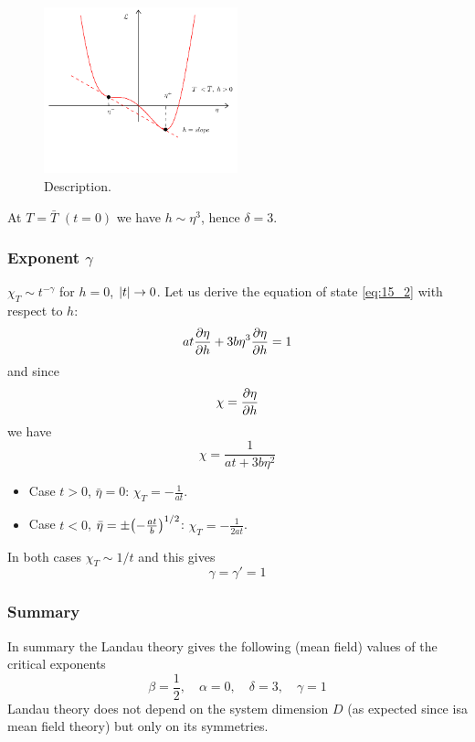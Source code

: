 \documentclass[../main/main.tex]{subfiles}
\begin{document}
\begin{figure}[h!]
\centering
\includegraphics[width=0.5\textwidth]{../lessons/15_image/15.pdf}
\caption{\label{fig:} Description.}
\end{figure}
At \( T= \bar{T}  \) \( (t=0) \) we have \( h \sim \eta ^3 \), hence \( \delta =3 \).

\subsubsection{Exponent \( \gamma   \)}
\( \chi _T \sim t^{- \gamma  } \) for \( h=0 \), \( \abs{t} \rightarrow 0  \). Let us derive the equation of state \eqref{eq:15_2} with respect to \( h \):
\begin{equation}
  a t \pdv{\eta }{h} + 3 b \eta ^3 \pdv{\eta }{h} = 1
\end{equation}
and since
\begin{equation}
  \chi = \pdv{\eta }{h}
\end{equation}
we have
\begin{equation}
  \chi = \frac{1}{at+3 b \eta ^2}
\end{equation}
\begin{itemize}
\item Case \( t>0 \), \( \bar{\eta } = 0  \): \( \chi _T = - \frac{1}{at} \).
\item Case \( t<0 \), \( \bar{\eta } = \pm \qty(- \frac{at}{b})^{1/2}   \): \( \chi _T = - \frac{1}{2at} \).
\end{itemize}
In both cases \( \chi _T \sim  1/t \) and this gives
\begin{equation}
  \gamma = \gamma' = 1
\end{equation}

\subsubsection{Summary}
In summary the Landau theory gives the following (mean field) values of the critical exponents
\begin{equation}
  \beta = \frac{1}{2}, \quad \alpha =0, \quad \delta =3, \quad \gamma =1
\end{equation}
Landau theory does not depend on the system dimension \( D \) (as expected since isa mean field theory) but only on its symmetries.
\end{document}
